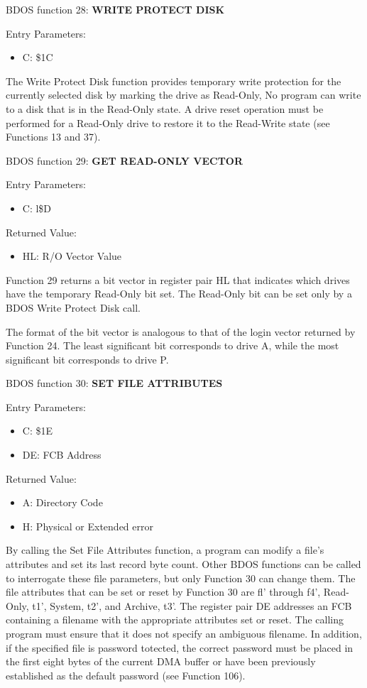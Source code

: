 BDOS function 28: \textbf{WRITE PROTECT DISK}

Entry Parameters:
\begin{itemize}
\item[] C: \$1C
\end{itemize}

The Write Protect Disk function provides temporary write protection
for the currently selected disk by marking the drive as Read-Only, No
program can write to a disk that is in the Read-Only state. A drive
reset operation must be performed for a Read-Only drive to restore it
to the Read-Write state (see Functions 13 and 37).

BDOS function 29: \textbf{GET READ-ONLY VECTOR}

Entry Parameters:
\begin{itemize}
\item[] C: l\$D
\end{itemize}

Returned Value:
\begin{itemize}
\item[] HL: R/O Vector Value
\end{itemize}

Function 29 returns a bit vector in register pair HL that indicates
which drives have the temporary Read-Only bit set. The Read-Only bit
can be set only by a BDOS Write Protect Disk call.

The format of the bit vector is analogous to that of the login vector
returned by Function 24. The least significant bit corresponds to
drive A, while the most significant bit corresponds to drive P.

BDOS function 30: \textbf{SET FILE ATTRIBUTES}

Entry Parameters:
\begin{itemize}
\item[] C: \$1E
\item[] DE: FCB Address
\end{itemize}

Returned Value:
\begin{itemize}
\item[] A: Directory Code
\item[] H: Physical or Extended error
\end{itemize}

By calling the Set File Attributes function, a program can modify a
file's attributes and set its last record byte count. Other BDOS
functions can be called to interrogate these file parameters, but only
Function 30 can change them. The file attributes that can be set or
reset by Function 30 are fl' through f4', Read-Only, t1', System, t2',
and Archive, t3'. The register pair DE addresses an FCB containing a
filename with the appropriate attributes set or reset. The calling
program must ensure that it does not specify an ambiguous filename. In
addition, if the specified file is password totected, the correct
password must be placed in the first eight bytes of the current DMA
buffer or have been previously established as the default password
(see Function 106).

